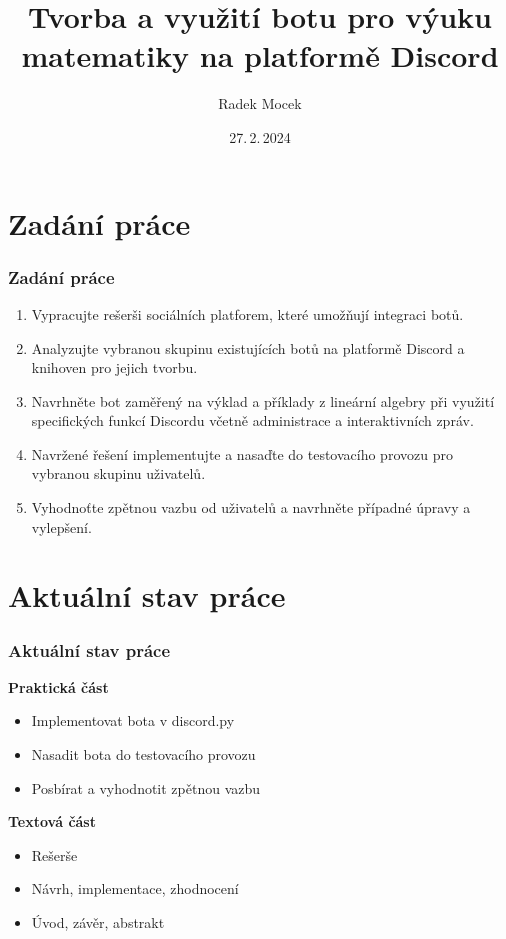 \documentclass[FM]{tulpresentation}
\title{Tvorba a využití botu pro výuku matematiky na platformě Discord}
\author{Radek Mocek}
\institute{}
\date{27.\,2.\,2024}
\newcommand{\otem}{\item[$\square$]}
\newcommand{\xtem}{\item[\rlap{\raisebox{0.3ex}{\hspace{0.4ex}\ding{52}}}$\square$]}
\begin{document}
	\TULtitleframe
	\section{Zadání práce}
	\begin{frame}[fragile]
		\frametitle{Zadání práce}
		\begin{enumerate}
			\item Vypracujte rešerši sociálních platforem, které umožňují integraci botů.
			\item Analyzujte vybranou skupinu existujících botů na platformě Discord a knihoven pro jejich tvorbu.
			\item Navrhněte bot zaměřený na výklad a příklady z lineární algebry při využití specifických funkcí Discordu včetně administrace a interaktivních zpráv.
			\item Navržené řešení implementujte a nasaďte do testovacího provozu pro vybranou skupinu uživatelů.
			\item Vyhodnoťte zpětnou vazbu od uživatelů a navrhněte případné úpravy a vylepšení.
		\end{enumerate}
	\end{frame}
	\section{Aktuální stav práce}
	\begin{frame}[fragile]
		\frametitle{Aktuální stav práce}
		\bigskip
		\textbf{Praktická část}
		\begin{itemize}
			\xtem Implementovat bota v discord.py
			\xtem Nasadit bota do testovacího provozu
			\otem Posbírat a vyhodnotit zpětnou vazbu
		\end{itemize}
		\bigskip
		\textbf{Textová část}
		\begin{itemize}
			\xtem Rešerše
			\otem Návrh, implementace, zhodnocení
			\otem Úvod, závěr, abstrakt
		\end{itemize}
	\end{frame}
\end{document}
